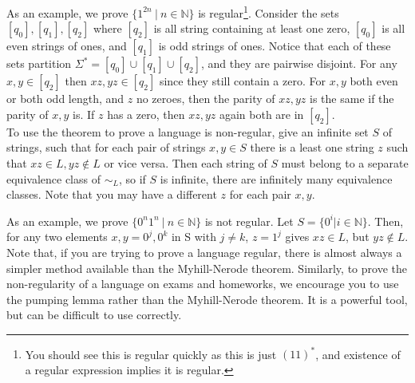 \documentclass[11pt]{article}
\begin{document}
As an example, we prove $\{1^{2n} ~|~ n \in \mathbb{N}\}$ is regular\footnote{You should see this is regular quickly as this is just $(11)^*$, and existence of a regular expression implies it is regular.}. Consider the sets $[q_0], [q_1], [q_2]$ where $[q_2]$ is all string containing at least one zero, $[q_0]$ is all even strings of ones, and $[q_1]$ is odd strings of ones. Notice that each of these sets partition $\Sigma^* = [q_0] \cup [q_1] \cup [q_2]$, and they are pairwise disjoint. For any $x,y \in [q_2]$ then $xz, yz \in [q_2]$ since they still contain a zero. For $x,y$ both even or both odd length, and $z$ no zeroes, then the parity of $xz, yz$ is the same if the parity of $x,y$ is. If $z$ has a zero, then $xz,yz$ again both are in $[q_2]$.  \\

To use the theorem to prove a language is non-regular, give an infinite set $S$ of strings, such that for each pair of strings $x,y \in S$ there is a least one string $z$ such that $xz \in L, yz \notin L$ or vice versa. Then each string of $S$ must belong to a separate equivalence class of $\sim_L$, so if $S$ is infinite, there are infinitely many equivalence classes. Note that you may have a different $z$ for each pair $x,y$.  

As an example, we prove $\{0^n1^n ~|~ n \in \mathbb{N}\}$ is not regular. Let $S = \{0^i | i \in \mathbb{N}\}$. Then, for any two elements $x,y = 0^j, 0^k$ in S with $j \neq k$, $z = 1^j$ gives $xz \in L$, but $yz \not \in L$. \\

Note that, if you are trying to prove a language regular, there is almost always a simpler method available than the Myhill-Nerode theorem. Similarly, to prove the non-regularity of a language on exams and homeworks, we encourage you to use the pumping lemma rather than the Myhill-Nerode theorem. It is a powerful tool, but can be difficult to use correctly.
\end{document}
